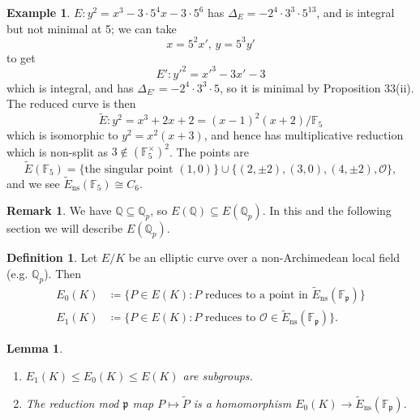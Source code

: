 \documentclass[a4paper]{article}
\newtheorem{lemma}[theorem]{Lemma}
\theoremstyle{definition}
\newtheorem*{definition}{Definition}
\newtheorem*{remark}{Remark}
\newtheorem*{example}{Example}
\newcommand{\ns}{\mathrm{ns}}
\newcommand{\p}{\mathfrak{p}}
\renewcommand{\O}{\mathcal{O}}
\newcommand{\F}{\mathbb{F}}
\newcommand{\Q}{\mathbb{Q}}
\begin{document}
\begin{example}
    $E:y^2=x^3-3\cdot5^4x-3\cdot5^6$ has $\Delta_E=-2^4\cdot3^3\cdot5^{13}$, and
    is integral but not minimal at 5; we can take
    \begin{equation*}
        x=5^2x',\,y=5^3y'
    \end{equation*}
    to get
    \begin{equation*}
        E':y'^2=x'^3-3x'-3
    \end{equation*}
    which is integral, and has $\Delta_{E'}=-2^4\cdot3^3\cdot5$, so it is
    minimal by Proposition 33(ii). The reduced curve is then
    \begin{equation*}
        \tilde E:y^2=x^3+2x+2 = (x-1)^2(x+2) / \F_5
    \end{equation*}
    which is isomorphic to $y^2=x^2(x+3)$, and hence has multiplicative
    reduction which is non-split as $3\notin(\F_5^\times)^2$. The points are
    \begin{equation*}
        \tilde E(\F_5) = \{\text{the singular point $(1,0)$}\}
            \cup\{(2,\pm2),(3,0),(4,\pm2),\O\},
    \end{equation*}
    and we see $\tilde E_\ns(\F_5)\cong C_6$.
\end{example}

\begin{remark}
    We have $\Q\subseteq\Q_p$, so $E(\Q)\subseteq E(\Q_p)$. In this and the
    following section we will describe $E(\Q_p)$.
\end{remark}

\begin{definition}
    Let $E/K$ be an elliptic curve over a non-Archimedean local field (e.g.
    $\Q_p$). Then
    \begin{align*}
        E_0(K) &\coloneq \{P\in E(K)
            :\text{$P$ reduces to a point in $\tilde E_\ns(\F_\p)$}\} \\
        E_1(K) &\coloneq \{P\in E(K)
            :\text{$P$ reduces to $\O\in\tilde E_\ns(\F_\p)$}\}.
    \end{align*}
\end{definition}

\begin{lemma}
    \begin{enumerate}[label=(\roman*)]
        \item $E_1(K)\le E_0(K)\le E(K)$ are subgroups.
        \item The reduction mod $\p$ map $P\mapsto\tilde P$ is a homomorphism
            $E_0(K)\to\tilde E_\ns(\F_\p)$.
    \end{enumerate}
\end{lemma}
\end{document}
